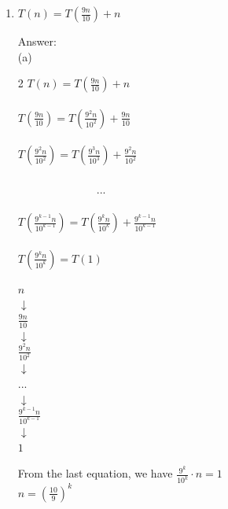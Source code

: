 \documentclass[15pt]{article}
\begin{document}
  
\pagestyle{empty}
 










\begin{enumerate}

\item 
$T(n) = T(\frac{9n}{10}) + n$  \\    %
{\color{blue} Answer:  \\
(a)
\begin{multicols}{2}
$T(n) = T(\frac{9n}{10}) + n$ \\\\
$T(\frac{9n}{10}) = T(\frac{9^2n}{10^2}) + \frac{9n}{10}$  \\\\
$T(\frac{9^2n}{10^2}) = T(\frac{9^3n}{10^3}) + \frac{9^2n}{10^2}$  \\\\
$\hspace{3cm} ...$ \\\\
$T(\frac{9^{k-1}n}{10^{k-1}}) = T(\frac{9^{k}n}{10^k}) + \frac{9^{k-1}n}{10^{k-1}}$ \\\\
$T(\frac{9^{k}n}{10^{k}}) = T(1) $
\columnbreak 
\begin{center}
$ n $\\
$\downarrow$ \\ 
$\frac{9n}{10}$\\
$\downarrow$ \\ 
$\frac{9^2n}{10^2}$ \\
$\downarrow$ \\
...\\
$\downarrow$\\
$\frac{9^{k-1}n}{10^{k-1}}$ \\
$\downarrow$\\
$1$\\
\end{center}
\end{multicols}
From the last equation, we have $\frac{9^{k}}{10^{k}} \cdot n = 1$\\
$n = (\frac{10}{9})^k$ \\
}
\end{enumerate}
\end{document}
